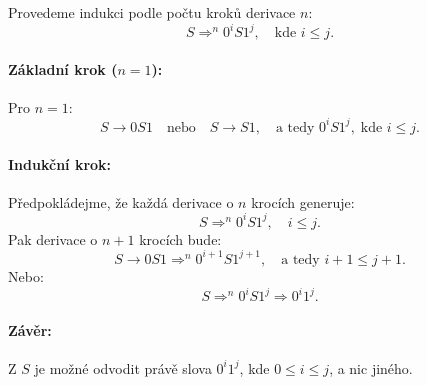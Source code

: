 Provedeme indukci podle počtu kroků derivace \( n \):
\[
S \Rightarrow^n 0^i S 1^j, \quad \text{kde } i \leq j.
\]

\paragraph{Základní krok (\(n = 1\)):}
Pro \(n = 1\):
\[
S \rightarrow 0 S 1 \quad \text{nebo} \quad S \rightarrow S 1, \quad \text{a tedy } 0^i S 1^j, \; \text{kde } i \leq j.
\]

\paragraph{Indukční krok:}
Předpokládejme, že každá derivace o \(n\) krocích generuje:
\[
S \Rightarrow^n 0^i S 1^j, \quad i \leq j.
\]
Pak derivace o \(n+1\) krocích bude:
\[
S \rightarrow 0 S 1 \Rightarrow^n 0^{i+1} S 1^{j+1}, \quad \text{a tedy } i+1 \leq j+1.
\]
Nebo:
\[
S \Rightarrow^n 0^i S 1^j \Rightarrow 0^i 1^j.
\]

\paragraph{Závěr:}
Z \(S\) je možné odvodit právě slova \(0^i 1^j\), kde \(0 \leq i \leq j\), a nic jiného.